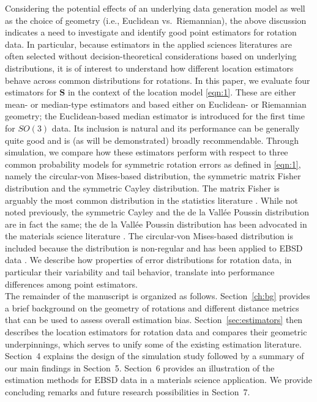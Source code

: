 Considering the potential effects of an underlying data generation model as well as the choice of geometry (i.e., Euclidean vs.~Riemannian), the above discussion indicates a need to investigate and identify good point estimators for rotation data.  In particular, because estimators in the applied sciences literatures  are often selected without decision-theoretical considerations based on underlying distributions, it is of interest to understand how different location estimators behave across common distributions for rotations.  In this paper, we evaluate four estimators for $\bm S$ in the context of the location model \eqref{eqn:1}. These are either mean- or median-type estimators and based either on Euclidean- or Riemannian geometry; the Euclidean-based median estimator is introduced for the first time for $SO(3)$ data. Its inclusion is natural and its performance can be generally quite good and is (as will be demonstrated) broadly recommendable.   Through simulation, we compare how these estimators perform with respect to three common probability models for symmetric rotation errors as defined in \eqref{eqn:1}, namely the circular-von Mises-based distribution, the symmetric matrix Fisher distribution and the symmetric Cayley distribution.  The matrix Fisher is arguably the most common distribution in the statistics literature \citep[see][]{chikuse03}. While not noted previously, the symmetric Cayley and the de la Vall\'{e}e Poussin distribution are in fact the same; the de la Vall\'{e}e Poussin distribution has been advocated in the materials science literature \citep{Schaeben97}.   The circular-von Mises-based distribution is included because the distribution is non-regular and has been applied to EBSD data \citep{bingham09}.  We describe how properties of error distributions for rotation data, in particular their variability and tail behavior, translate into performance differences among point estimators.\\

The remainder of the manuscript is organized  as follows.  Section~\ref{ch:bg} provides a brief background on the geometry of rotations and different distance metrics that can be used to assess overall estimation bias.   Section~\ref{sec:estimators} then describes the location estimators for rotation data  and compares their geometric underpinnings, which  serves to unify some of the existing estimation literature.  Section~4 explains the design of the simulation study followed by a summary of our main findings in Section~5. Section~6 provides an illustration of the estimation methods for EBSD data in a materials science application. We provide concluding remarks and future research possibilities in Section~7.
